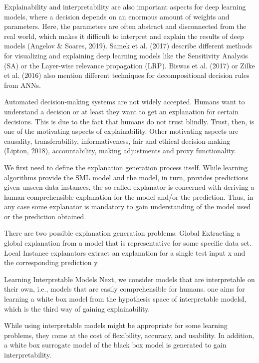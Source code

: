 Explainability and interpretability are also important aspects for deep learning models,
where a decision depends on an enormous amount of weights and parameters. Here, the parameters are often abstract and disconnected from the real world, which makes it difficult to interpret and explain the results of deep models (Angelov & Soares, 2019). Samek et al. (2017) describe different methods for visualizing and explaining deep learning models like the Sensitivity Analysis (SA) or the Layer-wise relevance propagation (LRP). Biswas et al. (2017) or Zilke et al. (2016) also mention different techniques for decompositional decision rules from ANNs.


Automated decision-making systems are not widely accepted. Humans want to understand a decision or at least they want to get an explanation for certain decisions. This is due to the fact that humans do not trust blindly. Trust, then, is one of the motivating aspects of explainability. Other motivating aspects are causality, transferability, informativeness, fair and ethical decision-making (Lipton, 2018), accountability, making adjustments and proxy functionality.


We first need to define the explanation generation process itself. While learning algorithms provide the SML model and the model, in turn, provides predictions given unseen data instances, the so-called explanator is concerned with deriving a human-comprehensible explanation for the model and/or the prediction. Thus, in any case some explanator is mandatory to gain understanding of the model used or the prediction obtained. 

There are two possible explanation generation problems: Global Extracting a global explanation from a model that is representative for some specific
data set. Local Instance explanators extract an explanation for a single test input x and the corresponding prediction y 


Learning Interpretable Models
Next, we consider models that are interpretable on their own, i.e., models that are easily comprehensible for humans. 
one aims for learning a white box model from the hypothesis
space of interpretable modelsI, which is the third way of gaining explainability.

 While using interpretable models might be appropriate for some learning problems, they come at the cost of flexibility, accuracy, and usability.
In addition, a white box surrogate model of the black box model is generated to gain
interpretability. 

